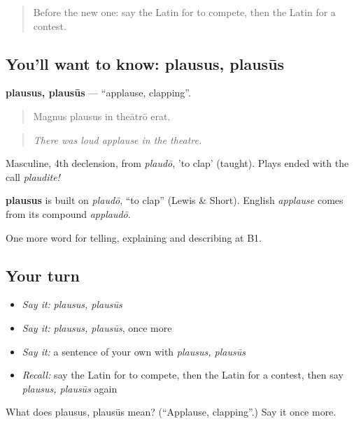 \label{lesson:LA-C337-plausus}



\begin{quote}
Before the new one: say the Latin for to compete, then the Latin for a contest.
\end{quote}

\subsection*{You'll want to know: plausus, plausūs}
\textbf{plausus, plausūs} — \textquotedblleft{}applause, clapping\textquotedblright{}.

\begin{quote}
Magnus plausus in theātrō erat.
\end{quote}

\begin{quote}
\emph{There was loud applause in the theatre.}
\end{quote}

Masculine, 4th declension, from \emph{plaudō}, 'to clap' (taught). Plays ended with the call \emph{plaudite!}

\begin{cousinweb}
\textbf{plausus} is built on \emph{plaudō}, \textquotedblleft{}to clap\textquotedblright{} (Lewis \& Short). English \emph{applause} comes from its compound \emph{applaudō}.
\end{cousinweb}

\begin{grammarlens}[title={What you've built}]
One more word for telling, explaining and describing at B1.
\end{grammarlens}

\subsection*{Your turn}
\begin{itemize}
\raggedright
  \item \emph{Say it:} \emph{plausus, plausūs}
  \item \emph{Say it:} \emph{plausus, plausūs}, once more
  \item \emph{Say it:} a sentence of your own with \emph{plausus, plausūs}
  \item \emph{Recall:} say the Latin for to compete, then the Latin for a contest, then say \emph{plausus, plausūs} again
\end{itemize}

\begin{tcolorbox}[breakable,colback=teal!4,colframe=teal!35!black,title={Before you move on}]
What does plausus, plausūs mean? (\textquotedblleft{}Applause, clapping\textquotedblright{}.) Say it once more.
\end{tcolorbox}
